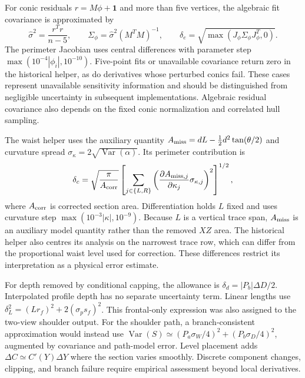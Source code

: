 \documentclass[11pt,a4paper]{article}
\begin{document}
For conic residuals $r=M\phi+\mathbf1$ and more than five vertices, the algebraic fit covariance is approximated by
\begin{equation}
 \hat\sigma^2=\frac{r^Tr}{n-5},\qquad
 \Sigma_\phi=\hat\sigma^2(M^TM)^{-1},\qquad
 \delta_e=\sqrt{\max(J_\phi\Sigma_\phi J_\phi^T,0)}.
\end{equation}
The perimeter Jacobian uses central differences with parameter step $\max(10^{-4}|\phi_i|,10^{-10})$. Five-point fits or unavailable covariance return zero in the historical helper, as do derivatives whose perturbed conics fail. These cases represent unavailable sensitivity information and should be distinguished from negligible uncertainty in subsequent implementations. Algebraic residual covariance also depends on the fixed conic normalization and correlated hull sampling.

The waist helper uses the auxiliary quantity $A_{\rm miss}=dL-\tfrac12d^2\tan(\theta/2)$ and curvature spread $\sigma_\kappa=2\sqrt{\operatorname{Var}(\alpha)}$. Its perimeter contribution is
\begin{equation}
 \delta_c=\sqrt{\frac{\pi}{A_{\rm corr}}}
 \left[\sum_{j\in\{L,R\}}
 \left(\frac{\partial A_{{\rm miss},j}}{\partial\kappa_j}\sigma_{\kappa,j}\right)^2\right]^{1/2},
 \label{eq:curvunc}
\end{equation}
where $A_{\rm corr}$ is corrected section area. Differentiation holds $L$ fixed and uses curvature step $\max(10^{-3}|\kappa|,10^{-9})$. Because $L$ is a vertical trace span, $A_{\rm miss}$ is an auxiliary model quantity rather than the removed $XZ$ area. The historical helper also centres its analysis on the narrowest trace row, which can differ from the proportional waist level used for correction. These differences restrict its interpretation as a physical error estimate.

For depth removed by conditional capping, the allowance is $\delta_d=|P_b|\Delta D/2$. Interpolated profile depth has no separate uncertainty term. Linear lengths use $\delta_L^2=(Lr_f)^2+2(\sigma_ps_f)^2$. This frontal-only expression was also assigned to the two-view shoulder output. For the shoulder path, a branch-consistent approximation would instead use $\operatorname{Var}(S)\simeq(P_a\sigma_W/4)^2+(P_b\sigma_D/4)^2$, augmented by covariance and path-model error. Level placement adds $\Delta C\simeq C'(Y)\Delta Y$ where the section varies smoothly. Discrete component changes, clipping, and branch failure require empirical assessment beyond local derivatives.
\end{document}
